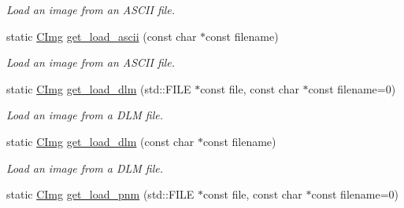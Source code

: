 \begin{DoxyCompactItemize}
\begin{DoxyCompactList}\small\item\em Load an image from an A\-S\-C\-I\-I file. \end{DoxyCompactList}\item 
\hypertarget{structcimg__library_1_1_c_img_a83fe2de29d9ccde21e2bc36e95cea931}{static \hyperlink{structcimg__library_1_1_c_img}{C\-Img} \hyperlink{structcimg__library_1_1_c_img_a83fe2de29d9ccde21e2bc36e95cea931}{get\-\_\-load\-\_\-ascii} (const char $\ast$const filename)}\label{structcimg__library_1_1_c_img_a83fe2de29d9ccde21e2bc36e95cea931}

\begin{DoxyCompactList}\small\item\em Load an image from an A\-S\-C\-I\-I file. \end{DoxyCompactList}\item 
\hypertarget{structcimg__library_1_1_c_img_acc2f61d36e9df6729f7997859ea9a827}{static \hyperlink{structcimg__library_1_1_c_img}{C\-Img} \hyperlink{structcimg__library_1_1_c_img_acc2f61d36e9df6729f7997859ea9a827}{get\-\_\-load\-\_\-dlm} (std\-::\-F\-I\-L\-E $\ast$const file, const char $\ast$const filename=0)}\label{structcimg__library_1_1_c_img_acc2f61d36e9df6729f7997859ea9a827}

\begin{DoxyCompactList}\small\item\em Load an image from a D\-L\-M file. \end{DoxyCompactList}\item 
\hypertarget{structcimg__library_1_1_c_img_aae7063fbd00d11c28e5c4b38e5ee37bb}{static \hyperlink{structcimg__library_1_1_c_img}{C\-Img} \hyperlink{structcimg__library_1_1_c_img_aae7063fbd00d11c28e5c4b38e5ee37bb}{get\-\_\-load\-\_\-dlm} (const char $\ast$const filename)}\label{structcimg__library_1_1_c_img_aae7063fbd00d11c28e5c4b38e5ee37bb}

\begin{DoxyCompactList}\small\item\em Load an image from a D\-L\-M file. \end{DoxyCompactList}\item 
\hypertarget{structcimg__library_1_1_c_img_ae510f9147c4980f4e2eefccba8b2d4c3}{static \hyperlink{structcimg__library_1_1_c_img}{C\-Img} \hyperlink{structcimg__library_1_1_c_img_ae510f9147c4980f4e2eefccba8b2d4c3}{get\-\_\-load\-\_\-pnm} (std\-::\-F\-I\-L\-E $\ast$const file, const char $\ast$const filename=0)}\label{structcimg__library_1_1_c_img_ae510f9147c4980f4e2eefccba8b2d4c3}


\end{DoxyCompactItemize}
